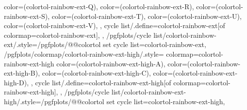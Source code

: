 {{{      color=(colortol-rainbow-ext-Q),
      color=(colortol-rainbow-ext-R),
      color=(colortol-rainbow-ext-S),
      color=(colortol-rainbow-ext-T),
      color=(colortol-rainbow-ext-U),
      color=(colortol-rainbow-ext-V),
    },
    cycle list/.define={colortol-rainbow-ext}{[of colormap=colortol-rainbow-ext]},
  },
  /pgfplots/cycle list/colortol-rainbow-ext/.style={/pgfplots/@@colortol set cycle list={colortol-rainbow-ext}},
  /pgfplots/colormap/colortol-rainbow-ext-high/.style={
    colormap={colortol-rainbow-ext-high}{
      color=(colortol-rainbow-ext-high-A),
      color=(colortol-rainbow-ext-high-B),
      color=(colortol-rainbow-ext-high-C),
      color=(colortol-rainbow-ext-high-D),
    },
    cycle list/.define={colortol-rainbow-ext-high}{[of colormap=colortol-rainbow-ext-high]},
  },
  /pgfplots/cycle list/colortol-rainbow-ext-high/.style={/pgfplots/@@colortol set cycle list={colortol-rainbow-ext-high}},
}
